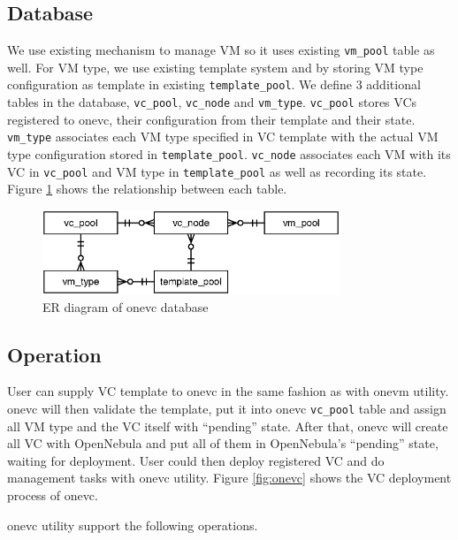 \documentclass[conference]{IEEEtran}
\begin{document}
\subsection{Database}
We use existing mechanism to manage VM so it uses existing \texttt{vm\_pool} table as well.
For VM type, we use existing template system and by storing VM type configuration as template in existing \texttt{template\_pool}.
We define 3 additional tables in the database, \texttt{vc\_pool}, \texttt{vc\_node} and \texttt{vm\_type}.
\texttt{vc\_pool} stores VCs registered to onevc, their configuration from their template and their state.
\texttt{vm\_type} associates each VM type specified in VC template with the actual VM type configuration stored in \texttt{template\_pool}.
\texttt{vc\_node} associates each VM with its VC in \texttt{vc\_pool} and VM type in \texttt{template\_pool} as well as recording its state.
Figure \ref{fig:database} shows the relationship between each table.

\begin{figure}[!t]
\centering
\includegraphics[width=3.5in]{database}
\caption{ER diagram of onevc database}
\label{fig:database}
\end{figure}

\subsection{Operation}
User can supply VC template to onevc in the same fashion as with onevm utility.
onevc will then validate the template, put it into onevc \texttt{vc\_pool} table and assign all VM type and the VC itself with ``pending'' state.
After that, onevc will create all VC with OpenNebula and put all of them in OpenNebula's ``pending'' state, waiting for deployment.
User could then deploy registered VC and do management tasks with onevc utility.
Figure \ref{fig:onevc} shows the VC deployment process of onevc.

onevc utility support the following operations.
\end{document}

